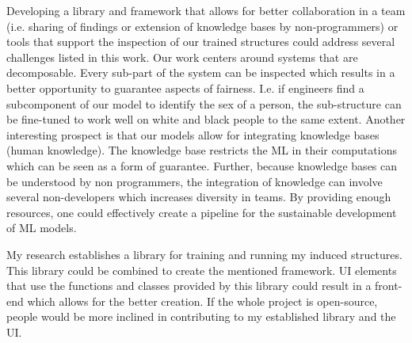 \documentclass[11pt]{article}
\begin{document}
Developing a library and framework that allows for better collaboration in a team (i.e. sharing of findings or extension of knowledge bases by non-programmers) or tools that support the inspection of our trained structures could address several challenges listed in this work. Our work centers around systems that are decomposable. Every sub-part of the system can be inspected which results in a better opportunity to guarantee aspects of fairness. I.e. if engineers find a subcomponent of our model to identify the sex of a person, the sub-structure can be fine-tuned to work well on white and black people to the same extent. Another interesting prospect is that our models allow for integrating knowledge bases (human knowledge). The knowledge base restricts the \ac{ML} in their computations which can be seen as a form of guarantee. Further, because knowledge bases can be understood by non programmers, the integration of knowledge can involve several non-developers which increases diversity in teams. By providing enough resources, one could effectively create a pipeline for the sustainable development of \ac{ML} models.

My research establishes a library for training and running my induced structures. This library could be combined to create the mentioned framework. UI elements that use the functions and classes provided by this library could result in a front-end which allows for the better creation. If the whole project is open-source, people would be more inclined in contributing to my established library and the UI.

\newpage


\end{document}
